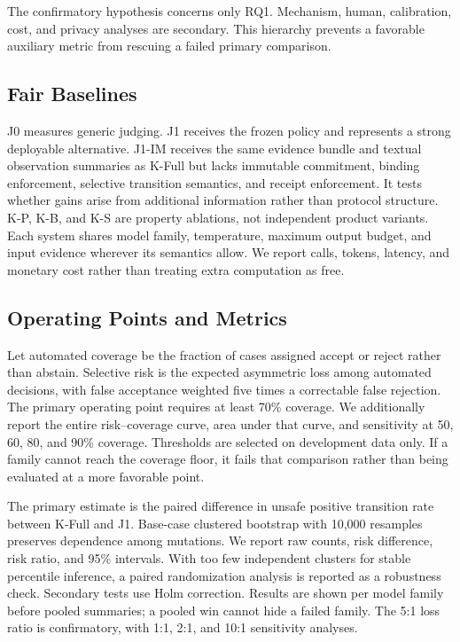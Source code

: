 \documentclass[sigconf,anonymous,review]{acmart}
\begin{document}
The confirmatory hypothesis concerns only RQ1. Mechanism, human, calibration, cost, and privacy analyses are secondary. This hierarchy prevents a favorable auxiliary metric from rescuing a failed primary comparison.

\subsection{Fair Baselines}
J0 measures generic judging. J1 receives the frozen policy and represents a strong deployable alternative. J1-IM receives the same evidence bundle and textual observation summaries as K-Full but lacks immutable commitment, binding enforcement, selective transition semantics, and receipt enforcement. It tests whether gains arise from additional information rather than protocol structure. K-P, K-B, and K-S are property ablations, not independent product variants. Each system shares model family, temperature, maximum output budget, and input evidence wherever its semantics allow. We report calls, tokens, latency, and monetary cost rather than treating extra computation as free.

\subsection{Operating Points and Metrics}
Let automated coverage be the fraction of cases assigned accept or reject rather than abstain. Selective risk is the expected asymmetric loss among automated decisions, with false acceptance weighted five times a correctable false rejection. The primary operating point requires at least 70\% coverage. We additionally report the entire risk--coverage curve, area under that curve, and sensitivity at 50, 60, 80, and 90\% coverage. Thresholds are selected on development data only. If a family cannot reach the coverage floor, it fails that comparison rather than being evaluated at a more favorable point.

The primary estimate is the paired difference in unsafe positive transition rate between K-Full and J1. Base-case clustered bootstrap with 10,000 resamples preserves dependence among mutations. We report raw counts, risk difference, risk ratio, and 95\% intervals. With too few independent clusters for stable percentile inference, a paired randomization analysis is reported as a robustness check. Secondary tests use Holm correction. Results are shown per model family before pooled summaries; a pooled win cannot hide a failed family. The 5:1 loss ratio is confirmatory, with 1:1, 2:1, and 10:1 sensitivity analyses.
\end{document}
